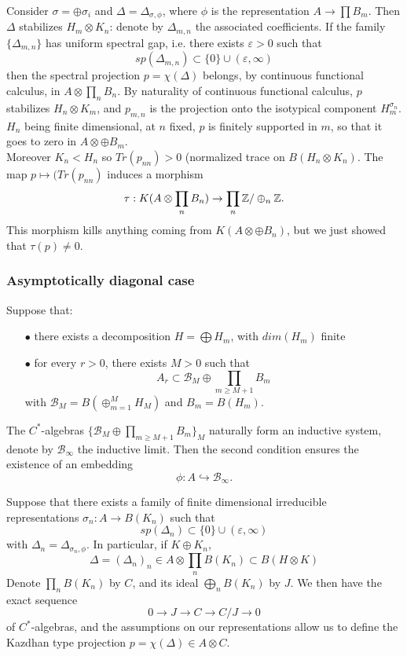 Consider $\sigma = \oplus \sigma_i$ and $\Delta = \Delta_{\sigma, \phi}$, where $\phi$ is the representation $A\rightarrow \prod B_m$. Then $\Delta$ stabilizes $H_m\otimes K_n$: denote by $\Delta_{m,n}$ the associated coefficients. If the family $\{\Delta_{m,n}\}$ has uniform spectral gap, i.e. there exists $\varepsilon>0$ such that
\[sp(\Delta_{m,n})\subset \{0\}\cup (\varepsilon, \infty) \]
then the spectral projection $p=\chi(\Delta)$ belongs, by continuous functional calculus, in $A\otimes \prod_n B_n$. By naturality of continuous functional calculus, $p$ stabilizes $H_n\otimes K_m$, and $p_{m,n}$ is the projection onto the isotypical component $H_m^{\sigma_n}$. $H_n$ being finite dimensional, at $n$ fixed, $p$ is finitely supported in $m$, so that it goes to zero in $A\otimes \oplus B_m$.\\

Moreover $K_n< H_n$ so $Tr(p_{nn})>0$ (normalized trace on $B(H_n\otimes K_n)$. The map $p \mapsto (Tr(p_{nn})$ induces
a morphism \[\tau : K(A\otimes \prod_n B_n) \rightarrow \prod_n \mathbb Z / \oplus_n \mathbb Z.\]
This morphism kills anything coming from $K(A\otimes \oplus B_n)$, but we just showed that $\tau(p)\neq 0$.

\subsubsection*{Asymptotically diagonal case}
Suppose that:
\begin{itemize} 
\item[$\bullet$] there exists a decomposition $H=\bigoplus H_m$, with $dim(H_m)$ finite
\item[$\bullet$] for every $r>0$, there exists $M>0$ such that 
\[A_r \subset \mathcal B_M \oplus \prod_{m\geq M+1} B_m \]
with $\mathcal B_M = B(\oplus_{m=1}^{M} H_M)$ and $B_m = B(H_m)$.
\end{itemize}

The $C^*$-algebras $\{\mathcal B_M \oplus \prod_{m\geq M+1} B_m \}_M$ naturally form an inductive system, denote by $\mathcal B_\infty$ the inductive limit. Then the second condition ensures the existence of an embedding
\[\phi: A \hookrightarrow \mathcal B_\infty.\]

Suppose that there exists a family of finite dimensional irreducible representations $\sigma_n : A \rightarrow B(K_n)$ such that 
\[sp(\Delta_{n}) \subset \{0\} \cup (\varepsilon, \infty)\]
with $\Delta_n = \Delta_{\sigma_n,\phi}$. In particular, if $K\oplus K_n$, 
\[\Delta = (\Delta_n)_n \in A\otimes \prod_n B(K_n) \subset B(H\otimes K) \]
Denote $\prod_n B(K_n)$ by $C$, and its ideal $\bigoplus_n B(K_n)$ by $J$. We then have the exact sequence
\[0 \rightarrow J \rightarrow C \rightarrow C/J \rightarrow 0\]
of $C^*$-algebras, and the assumptions on our representations allow us to define the Kazdhan type projection $p = \chi(\Delta)\in A\otimes C$.\\


